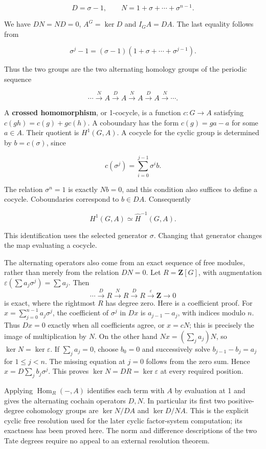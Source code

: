 \documentclass[11pt,a4paper]{article}
\begin{document}
\[
D=\sigma-1,
\qquad N=1+\sigma+\cdots+\sigma^{n-1}.
\]

We have \(DN=ND=0\), \(A^G=\ker D\) and \(I_GA=DA\). The last equality
follows from

\[
\sigma^j-1=(\sigma-1)(1+\sigma+\cdots+\sigma^{j-1}).
\]

Thus the two groups are the two alternating homology groups of the
periodic sequence

\[
\cdots\xrightarrow{N}A\xrightarrow{D}A\xrightarrow{N}A\xrightarrow{D}A\xrightarrow{N}\cdots.
\]

A \textbf{crossed homomorphism}, or 1-cocycle, is a function
\(c:G\to A\) satisfying \(c(gh)=c(g)+g c(h)\). A coboundary has the form
\(c(g)=ga-a\) for some \(a\in A\). Their quotient is \(H^1(G,A)\). A
cocycle for the cyclic group is determined by \(b=c(\sigma)\), since

\[
c(\sigma^j)=\sum_{i=0}^{j-1}\sigma^i b.
\]

The relation \(\sigma^n=1\) is exactly \(Nb=0\), and this condition also
suffices to define a cocycle. Coboundaries correspond to \(b\in DA\).
Consequently

\[
H^1(G,A)\simeq\widehat H^{-1}(G,A).
\]

This identification uses the selected generator \(\sigma\). Changing
that generator changes the map evaluating a cocycle.

The alternating operators also come from an exact sequence of free
modules, rather than merely from the relation \(DN=0\). Let
\(R=\mathbf Z[G]\), with augmentation
\(\varepsilon(\sum a_j\sigma^j)=\sum a_j\). Then \[
\cdots\xrightarrow{D}R\xrightarrow{N}R
\xrightarrow{D}R\xrightarrow{\varepsilon}\mathbf Z\longrightarrow0
\] is exact, where the rightmost \(R\) has degree zero. Here is a
coefficient proof. For \(x=\sum_{j=0}^{n-1}a_j\sigma^j\), the
coefficient of \(\sigma^j\) in \(Dx\) is \(a_{j-1}-a_j\), with indices
modulo \(n\). Thus \(Dx=0\) exactly when all coefficients agree, or
\(x=cN\); this is precisely the image of multiplication by \(N\). On the
other hand \(Nx=(\sum_j a_j)N\), so \(\ker N=\ker\varepsilon\). If
\(\sum_j a_j=0\), choose \(b_0=0\) and successively solve
\(b_{j-1}-b_j=a_j\) for \(1\leq j<n\). The missing equation at \(j=0\)
follows from the zero sum. Hence \(x=D\sum_j b_j\sigma^j\). This proves
\(\ker N=DR=\ker\varepsilon\) at every required position.

Applying \(\operatorname{Hom}_R(-,A)\) identifies each term with \(A\)
by evaluation at 1 and gives the alternating cochain operators \(D,N\).
In particular its first two positive-degree cohomology groups are
\(\ker N/DA\) and \(\ker D/NA\). This is the explicit cyclic free
resolution used for the later cyclic factor-system computation; its
exactness has been proved here. The norm and difference descriptions of
the two Tate degrees require no appeal to an external resolution
theorem.
\end{document}
